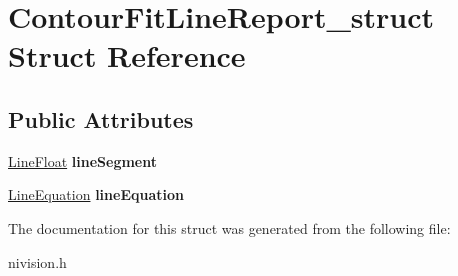 \hypertarget{structContourFitLineReport__struct}{
\section{ContourFitLineReport\_\-struct Struct Reference}
\label{structContourFitLineReport__struct}
}
\subsection*{Public Attributes}
\begin{DoxyCompactItemize}
\item 
\hypertarget{structContourFitLineReport__struct_a0b2cad246eb41fc803c4867f4a5b1bf6}{
\hyperlink{structLineFloat__struct}{LineFloat} {\bfseries lineSegment}}
\label{structContourFitLineReport__struct_a0b2cad246eb41fc803c4867f4a5b1bf6}

\item 
\hypertarget{structContourFitLineReport__struct_ae12771ee1d2671bbefe26f2ec427a07b}{
\hyperlink{structLineEquation__struct}{LineEquation} {\bfseries lineEquation}}
\label{structContourFitLineReport__struct_ae12771ee1d2671bbefe26f2ec427a07b}

\end{DoxyCompactItemize}


The documentation for this struct was generated from the following file:\begin{DoxyCompactItemize}
\item 
nivision.h\end{DoxyCompactItemize}
